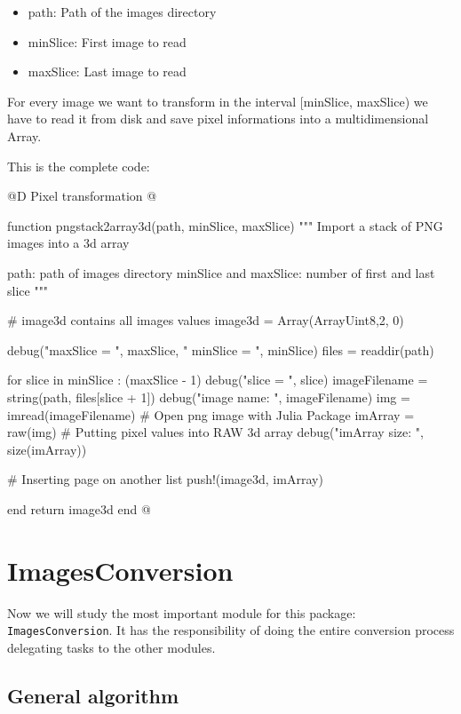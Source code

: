 \documentclass[11pt,oneside]{article}	%
\begin{document}
\begin{itemize}
 \item path: Path of the images directory
 \item minSlice: First image to read
 \item maxSlice: Last image to read
\end{itemize}

For every image we want to transform in the interval [minSlice, maxSlice) we have to read it from disk and save pixel informations into a multidimensional Array.

This is the complete code:

@D Pixel transformation
@{function pngstack2array3d(path, minSlice, maxSlice)
  """
  Import a stack of PNG images into a 3d array

  path: path of images directory
  minSlice and maxSlice: number of first and last slice
  """

  # image3d contains all images values
  image3d = Array(Array{Uint8,2}, 0)

  debug("maxSlice = ", maxSlice, " minSlice = ", minSlice)
  files = readdir(path)

  for slice in minSlice : (maxSlice - 1)
    debug("slice = ", slice)
    imageFilename = string(path, files[slice + 1])
    debug("image name: ", imageFilename)
    img = imread(imageFilename) # Open png image with Julia Package
    imArray = raw(img) # Putting pixel values into RAW 3d array
    debug("imArray size: ", size(imArray))

    # Inserting page on another list
    push!(image3d, imArray)

  end
  return image3d
end
@}

\section{ImagesConversion}\label{sec:ImagesConversion}
Now we will study the most important module for this package: \texttt{ImagesConversion}. It has the responsibility of doing the entire conversion process delegating tasks to the other modules.

\subsection{General algorithm}\label{sec:generalAlgorithm}
\end{document}

